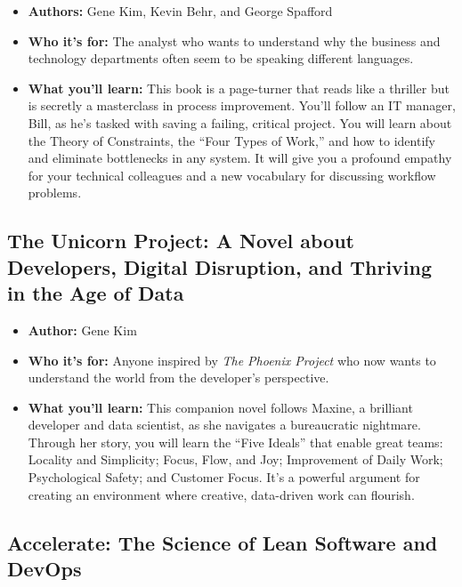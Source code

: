 \documentclass[
  letterpaper,
  DIV=11,
  numbers=noendperiod]{scrreprt}
\providecommand{\tightlist}{%
  \setlength{\itemsep}{0pt}\setlength{\parskip}{0pt}}
\begin{document}
\begin{itemize}
\tightlist
\item
  \textbf{Authors:} Gene Kim, Kevin Behr, and George Spafford
\item
  \textbf{Who it's for:} The analyst who wants to understand why the
  business and technology departments often seem to be speaking
  different languages.
\item
  \textbf{What you'll learn:} This book is a page-turner that reads like
  a thriller but is secretly a masterclass in process improvement.
  You'll follow an IT manager, Bill, as he's tasked with saving a
  failing, critical project. You will learn about the Theory of
  Constraints, the ``Four Types of Work,'' and how to identify and
  eliminate bottlenecks in any system. It will give you a profound
  empathy for your technical colleagues and a new vocabulary for
  discussing workflow problems.
\end{itemize}

\subsection{\texorpdfstring{\textbf{The Unicorn Project: A Novel about
Developers, Digital Disruption, and Thriving in the Age of
Data}}{The Unicorn Project: A Novel about Developers, Digital Disruption, and Thriving in the Age of Data}}\label{the-unicorn-project-a-novel-about-developers-digital-disruption-and-thriving-in-the-age-of-data}

\begin{itemize}
\tightlist
\item
  \textbf{Author:} Gene Kim
\item
  \textbf{Who it's for:} Anyone inspired by \emph{The Phoenix Project}
  who now wants to understand the world from the developer's
  perspective.
\item
  \textbf{What you'll learn:} This companion novel follows Maxine, a
  brilliant developer and data scientist, as she navigates a
  bureaucratic nightmare. Through her story, you will learn the ``Five
  Ideals'' that enable great teams: Locality and Simplicity; Focus,
  Flow, and Joy; Improvement of Daily Work; Psychological Safety; and
  Customer Focus. It's a powerful argument for creating an environment
  where creative, data-driven work can flourish.
\end{itemize}

\subsection{\texorpdfstring{\textbf{Accelerate: The Science of Lean
Software and
DevOps}}{Accelerate: The Science of Lean Software and DevOps}}\label{accelerate-the-science-of-lean-software-and-devops}
\end{document}
